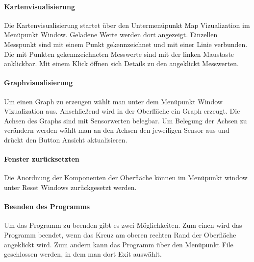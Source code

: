 \paragraph{Kartenvisualisierung}
Die Kartenvisualisierung startet über den Untermenüpunkt Map Vizualization im Menüpunkt Window. Geladene Werte werden dort angezeigt. Einzellen Messpunkt sind mit einem Punkt gekennzeichnet und mit einer Linie verbunden. Die mit Punkten gekennzeichneten Messwerte sind mit der linken Maustaste anklickbar. Mit einem Klick öffnen sich Details zu den angeklickt Messwerten.

\paragraph{Graphvisualisierung}
Um einen Graph zu erzeugen wählt man unter dem Menüpunkt Window Vizualization aus. Anschließend wird in der Oberfläche ein Graph erzeugt. Die Achsen des Graphs sind mit Sensorwerten belegbar. Um Belegung der Achsen zu verändern werden wählt man an den Achsen den jeweiligen Sensor aus und drückt den Button Ansicht aktualisieren.


\paragraph{Fenster zurücksetzten}
Die Anordnung der Komponenten der Oberfläche können im Menüpunkt window unter Reset Windows zurückgesetzt werden.

\paragraph{Beenden des Programms}
Um das Programm zu beenden gibt es zwei Möglichkeiten. Zum einen wird das Programm beendet, wenn das Kreuz am oberen rechten Rand der Oberfläche angeklickt wird. Zum andern kann das Programm über den Menüpunkt File geschlossen werden, in dem man dort Exit auswählt.